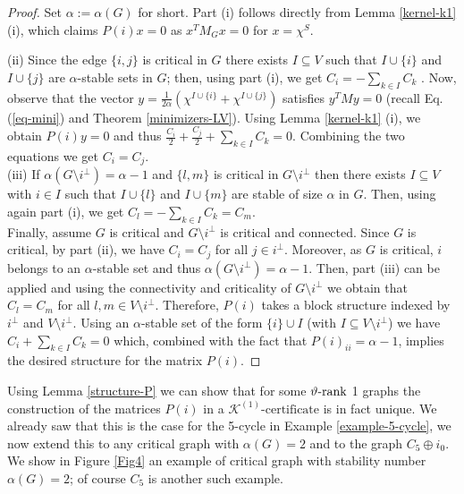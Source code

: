 \documentclass[11pt]{article}
\newcommand{\konec}{\MK^{(1)}\text{-certificate}}
\numberwithin{equation}{section}
\newcommand{\MK}{{\mathcal K}}
\newcommand{\rrank}{\vartheta\text{\rm -rank}}
\newcommand{\MoL}{\textcolor{red}}
\begin{document}
\begin{proof} Set $\alpha:=\alpha(G)$ for short.
Part (i) follows directly from Lemma \ref{kernel-k1} (i), which claims $P(i)x=0$ as  $x^T M_Gx=0$ for $x=\chi^S$.

(ii)  Since the edge $\{i,j\}$ is critical  in $G$ there exists $I\subseteq V$ such that $I\cup \{i\}$ and $I\cup\{j\}$ are $\alpha$-stable sets in $G$; then,  using part (i), we get  $C_i=-\sum_{k\in I}C_k$ . Now,  observe that  the vector $y= \frac{1}{2\alpha}(\chi^{I\cup\{i\}} + \chi^{I\cup\{j\}})$ satisfies  $y^TMy=0$ (recall Eq. (\ref{eq-mini}) and Theorem \ref{minimizers-LV}). Using Lemma \ref{kernel-k1} (i), we obtain $P(i)y=0$ and thus $\frac{C_i}{2}+\frac{C_j}{2}+\sum_{k\in I}C_k=0$. Combining the two equations we get $C_i=C_j$.
\\
(iii) If $\alpha(G\setminus i^\perp)=\alpha-1$ and $\{l,m\}$ is critical in $G\setminus i^\perp$ then there exists $I\subseteq V$ with $i\in I$ such that $I\cup\{l\}$ and $I\cup\{m\}$ are stable of size $\alpha$ in $G$. Then, using again part (i), we get $C_l=-\sum_{k\in I}C_k = C_m$.   
\\
Finally, assume $G$ is critical and $G\setminus i^\perp$ is critical and connected. Since $G$ is critical, by part (ii), we have $C_i=C_j$ for all $j\in i^\perp$. Moreover,  as $G$ is critical, $i$ belongs to an $\alpha$-stable set and thus  $\alpha(G\setminus i^\perp)=\alpha-1$. Then, part (iii) can be applied and using the connectivity and criticality of $G\setminus i^\perp$ we obtain that $C_l=C_m$ for all $l,m\in V \setminus i^\perp$. Therefore, $P(i)$ takes a block structure indexed by $i^\perp$ and $V\setminus i^\perp$. Using an $\alpha$-stable set of the form $\{i\}\cup I$ (with $I\subseteq V\setminus i^\perp$) we have 
$C_i+\sum_{k\in I}C_k=0$ which, combined with the fact that $P(i)_{ii}=\alpha-1$, implies the desired structure for the matrix $P(i)$.
\end{proof}

Using Lemma \ref{structure-P} we can show that for some $\rrank$ 1 graphs the construction of the matrices $P(i)$ in a $\konec$ is in fact unique. 
We already saw that this is the case for the 5-cycle in Example \ref{example-5-cycle}, we now extend this to any critical graph with $\alpha(G)=2$ and to the graph $C_5\oplus i_0$. We show in Figure \ref{Fig4} an example of critical graph with stability number $\alpha(G)=2$; of course  $C_5$ is another such  example.
\end{document}
